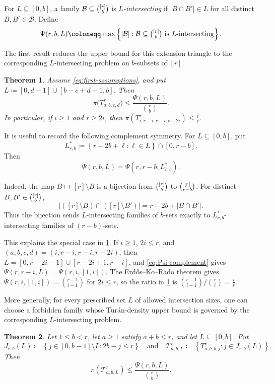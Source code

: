 \documentclass[10pt,a4paper]{article}
\theoremstyle{plain}
\newtheorem{theorem}{Theorem}[section]
\theoremstyle{definition}
\theoremstyle{plain}
\newcommand{\calB}{\mathcal B}
\newcommand{\calT}{\mathcal T}
\begin{document}
For $L\subseteq[0,b]$, a family $\calB\subseteq\tbinom{[r]}{b}$ is \emph{$L$-intersecting} if $|B\cap B'|\in L$ for all distinct $B,B'\in\calB$.  Define
\[
        \Psi(r,b,L)\coloneqq\max\left\{|\calB|:\calB\subseteq\tbinom{[r]}{b}
        \text{ is }L\text{-intersecting}\right\}.
\]

The first result reduces the upper bound for this extension triangle to the corresponding $L$-intersecting problem on $b$-subsets of $[r]$.

\begin{theorem}\label{thm:first-main}
Assume \cref{eq:first-assumptions}, and put $L \coloneqq [0,d-1]\cup[b-c+d+1,b]$.  Then
\[
        \pi\bigl(T^r_{a,b,c,d}\bigr)
        \le \frac{\Psi\left(r,b,L\right)}{\binom{r}{b}}.
\]
In particular, if $i\ge1$ and $r \ge 2i$, then $\pi(T^r_{i,r-i,r-i,r-2i})\le\frac{i}{r}$. 
\end{theorem}

It is useful to record the following complement symmetry.  For $L\subseteq[0,b]$, put
\[
        L^{\ast}_{r,b}\coloneqq
        \left\{r-2b+\ell:\ell\in L\right\}\cap[0,r-b].
\]
Then
\begin{equation}\label{eq:Psi-complement}
        \Psi(r,b,L)=\Psi(r,r-b,L^{\ast}_{r,b}).
\end{equation}

Indeed, the map $B\mapsto [r]\setminus B$ is a bijection from $\tbinom{[r]}{b}$ to
$\tbinom{[r]}{r-b}$.  For distinct $B,B'\in\tbinom{[r]}{b}$,
\[
        |([r]\setminus B)\cap([r]\setminus B')|
        =r-2b+|B\cap B'|.
\]
Thus the bijection sends $L$-intersecting families of $b$-sets exactly to
$L^{\ast}_{r,b}$-intersecting families of $(r-b)$-sets.

This explains the special case in \cref{thm:first-main}.  If $i\ge1$, $2i\le r$, and $(a,b,c,d) = (i, r-i, r-i, r-2i)$, then $L=[0,r-2i-1]\cup[r-2i+1,r-i]$, and \cref{eq:Psi-complement} gives $\Psi(r,r-i,L)=\Psi(r,i,[1,i])$.  The Erd\H{o}s--Ko--Rado theorem \cite{EKR61} gives $\Psi(r,i,[1,i])=\binom{r-1}{i-1}$ for $2i\le r$, so the ratio in \cref{thm:first-main} is ${\binom{r-1}{i-1}}/{\binom{r}{i}}=\frac{i}{r}$.

More generally, for every prescribed set $L$ of allowed intersection sizes, one can choose a forbidden family whose Tur\'an-density upper bound is governed by the corresponding $L$-intersecting problem. 

\begin{theorem}\label{thm:arbitrary-L}
Let $1\le b<r$, let $a\ge1$ satisfy $a+b\le r$, and let $L\subseteq[0,b]$.  Put
\[
        J_{r,b}(L)\coloneqq
        \left\{j\in[0,b-1]\setminus L: 2b-j\le r\right\}
        \quad\text{and}\quad 
        \calT^r_{a,b,L}\coloneqq
        \left\{T^r_{a,b,b,j}:j\in J_{r,b}(L)\right\}.
\]
Then
\[
        \pi(\calT^r_{a,b,L})
        \le \frac{\Psi(r,b,L)}{\binom{r}{b}}.
\]
\end{theorem}
\end{document}
